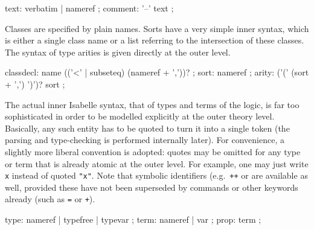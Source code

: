 \begin{isabellebody}
\begin{isamarkuptext}
  \begin{rail}
    text: verbatim | nameref
    ;
    comment: '--' text
    ;
  \end{rail}%
\end{isamarkuptext}%
\isamarkuptrue%
%
\isamarkuptrue%
%
\begin{isamarkuptext}%
Classes are specified by plain names.  Sorts have a very simple
  inner syntax, which is either a single class name  or a
  list  referring to the
  intersection of these classes.  The syntax of type arities is given
  directly at the outer level.


  \begin{rail}
    classdecl: name (('<' | subseteq) (nameref + ','))?
    ;
    sort: nameref
    ;
    arity: ('(' (sort + ',') ')')? sort
    ;
  \end{rail}%
\end{isamarkuptext}%
\isamarkuptrue%
%
\isamarkuptrue%
%
\begin{isamarkuptext}%
The actual inner Isabelle syntax, that of types and terms of the
  logic, is far too sophisticated in order to be modelled explicitly
  at the outer theory level.  Basically, any such entity has to be
  quoted to turn it into a single token (the parsing and type-checking
  is performed internally later).  For convenience, a slightly more
  liberal convention is adopted: quotes may be omitted for any type or
  term that is already atomic at the outer level.  For example, one
  may just write \verb|x| instead of quoted \verb|"x"|.
  Note that symbolic identifiers (e.g.\ \verb|++| or \isa{{\isasymforall}} are available as well, provided these have not been superseded
  by commands or other keywords already (such as \verb|=| or
  \verb|+|).

  \begin{rail}
    type: nameref | typefree | typevar
    ;
    term: nameref | var
    ;
    prop: term
    ;
  \end{rail}


\end{isamarkuptext}
\end{isabellebody}
